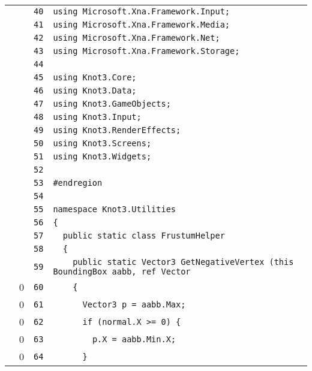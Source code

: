 \documentclass[a4paper,10pt]{article}
\begin{document}
\begin{longtable}[l]{lrrl}
\cellcolor{gray} &  & \verb~40~ & \verb~using Microsoft.Xna.Framework.Input;~\\
\cellcolor{gray} &  & \verb~41~ & \verb~using Microsoft.Xna.Framework.Media;~\\
\cellcolor{gray} &  & \verb~42~ & \verb~using Microsoft.Xna.Framework.Net;~\\
\cellcolor{gray} &  & \verb~43~ & \verb~using Microsoft.Xna.Framework.Storage;~\\
\cellcolor{gray} &  & \verb~44~ & \verb~~\\
\cellcolor{gray} &  & \verb~45~ & \verb~using Knot3.Core;~\\
\cellcolor{gray} &  & \verb~46~ & \verb~using Knot3.Data;~\\
\cellcolor{gray} &  & \verb~47~ & \verb~using Knot3.GameObjects;~\\
\cellcolor{gray} &  & \verb~48~ & \verb~using Knot3.Input;~\\
\cellcolor{gray} &  & \verb~49~ & \verb~using Knot3.RenderEffects;~\\
\cellcolor{gray} &  & \verb~50~ & \verb~using Knot3.Screens;~\\
\cellcolor{gray} &  & \verb~51~ & \verb~using Knot3.Widgets;~\\
\cellcolor{gray} &  & \verb~52~ & \verb~~\\
\cellcolor{gray} &  & \verb~53~ & \verb~#endregion~\\
\cellcolor{gray} &  & \verb~54~ & \verb~~\\
\cellcolor{gray} &  & \verb~55~ & \verb~namespace Knot3.Utilities~\\
\cellcolor{gray} &  & \verb~56~ & \verb~{~\\
\cellcolor{gray} &  & \verb~57~ & \verb~  public static class FrustumHelper~\\
\cellcolor{gray} &  & \verb~58~ & \verb~  {~\\
\cellcolor{gray} &  & \verb~59~ & \verb~    public static Vector3 GetNegativeVertex (this BoundingBox aabb, ref Vector~\\
\cellcolor{red} & 0 & \verb~60~ & \verb~    {~\\
\cellcolor{red} & 0 & \verb~61~ & \verb~      Vector3 p = aabb.Max;~\\
\cellcolor{red} & 0 & \verb~62~ & \verb~      if (normal.X >= 0) {~\\
\cellcolor{red} & 0 & \verb~63~ & \verb~        p.X = aabb.Min.X;~\\
\cellcolor{red} & 0 & \verb~64~ & \verb~      }~\\

\end{longtable}
\end{document}
